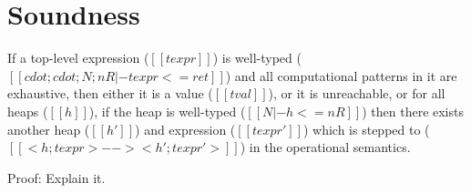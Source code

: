 \section{Soundness}

\begin{theorem}
If a top-level expression ($[[ texpr ]]$) is well-typed
($[[ cdot ; cdot ; N ; nR |- texpr <= ret ]]$) and all computational patterns
in it are exhaustive, then either it is a value ($[[ tval ]]$), or it is
unreachable, or for all heaps ($[[ h ]]$), if the heap is well-typed
($[[ N |- h <= nR ]]$) then there exists another heap ($[[ h' ]]$) and expression
($[[ texpr' ]]$) which is stepped to ($[[ < h ; texpr > --> < h' ; texpr' > ]]$)
in the operational semantics.
\end{theorem}
Proof: Explain it.

%

